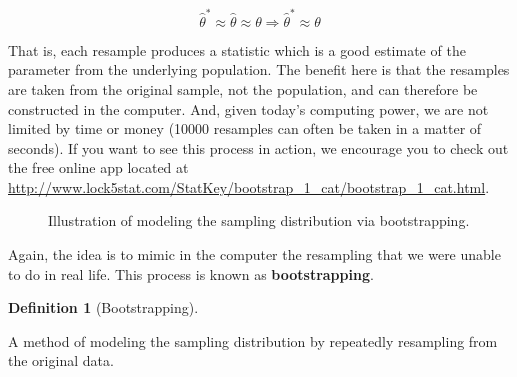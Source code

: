 \documentclass[
  letterpaper,
  DIV=11,
  numbers=noendperiod]{scrreprt}
\theoremstyle{plain}
\theoremstyle{definition}
\theoremstyle{definition}
\newtheorem{definition}{Definition}[chapter]
\theoremstyle{remark}
\begin{document}
\[
\widehat{\theta}^* \approx \widehat{\theta} \approx \theta \Rightarrow \widehat{\theta}^* \approx \theta
\]

That is, each resample produces a statistic which is a good estimate of
the parameter from the underlying population. The benefit here is that
the resamples are taken from the original sample, not the population,
and can therefore be constructed in the computer. And, given today's
computing power, we are not limited by time or money (10000 resamples
can often be taken in a matter of seconds). If you want to see this
process in action, we encourage you to check out the free online app
located at
\url{http://www.lock5stat.com/StatKey/bootstrap_1_cat/bootstrap_1_cat.html}.

\begin{figure}


\caption{\label{fig-samplingdistns-bootstrap}Illustration of modeling
the sampling distribution via bootstrapping.}

\end{figure}%

Again, the idea is to mimic in the computer the resampling that we were
unable to do in real life. This process is known as
\textbf{bootstrapping}.

\begin{definition}[Bootstrapping]\protect\hypertarget{def-bootstrap}{}\label{def-bootstrap}

A method of modeling the sampling distribution by repeatedly resampling
from the original data.

\end{definition}
\end{document}
